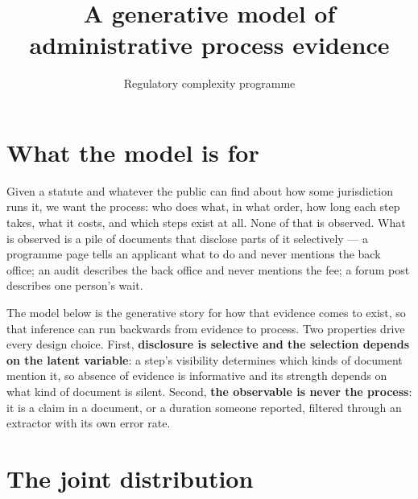 \documentclass[11pt]{article}
\title{A generative model of administrative process evidence}
\author{Regulatory complexity programme}
\date{}
\begin{document}
\maketitle

\section{What the model is for}

Given a statute and whatever the public can find about how some jurisdiction runs it, we want the
process: who does what, in what order, how long each step takes, what it costs, and which steps exist at
all. None of that is observed. What is observed is a pile of documents that disclose parts of it
selectively --- a programme page tells an applicant what to do and never mentions the back office; an
audit describes the back office and never mentions the fee; a forum post describes one person's wait.

The model below is the generative story for how that evidence comes to exist, so that inference can run
backwards from evidence to process. Two properties drive every design choice. First, \textbf{disclosure
is selective and the selection depends on the latent variable}: a step's visibility determines which
kinds of document mention it, so absence of evidence is informative and its strength depends on what
kind of document is silent. Second, \textbf{the observable is never the process}: it is a claim in a
document, or a duration someone reported, filtered through an extractor with its own error rate.

\begin{figure}
  \centering
  \resizebox{\textheight}{!}{}
  
\end{figure}

\section{The joint distribution}
\end{document}
